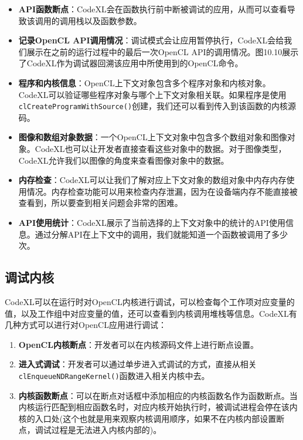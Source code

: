\begin{itemize}
\item \textbf{API函数断点}：CodeXL会在函数执行前中断被调试的应用，从而可以查看导致该调用的调用栈以及函数参数。
\item \textbf{记录OpenCL API调用情况}：调试模式会让应用暂停执行，CodeXL会给我们展示在之前的运行过程中的最后一次OpenCL API的调用情况。图10.10展示了CodeXL作为调试器回溯该应用中所使用到的OpenCL命令。
\item \textbf{程序和内核信息}：OpenCL上下文对象包含多个程序对象和内核对象。CodeXL可以验证哪些程序对象与哪个上下文对象相关联。如果程序是使用\texttt{clCreateProgramWithSource()}创建，我们还可以看到传入到该函数的内核源码。
\item \textbf{图像和数组对象数据}：一个OpenCL上下文对象中包含多个数组对象和图像对象。CodeXL也可以让开发者直接查看这些对象中的数据。对于图像类型，CodeXL允许我们以图像的角度来查看图像对象中的数据。
\item \textbf{内存检查}：CodeXL可以让我们了解对应上下文对象的数组对象中内存内存使用情况。内存检查功能可以用来检查内存泄漏，因为在设备端内存不能直接被查看到，所以要查到相关问题会非常的困难。
\item \textbf{API使用统计}：CodeXL展示了当前选择的上下文对象中的统计的API使用信息。通过分解API在上下文中的调用，我们就能知道一个函数被调用了多少次。
\end{itemize}


\subsection{调试内核}

CodeXL可以在运行时对OpenCL内核进行调试，可以检查每个工作项对应变量的值，以及工作组中对应变量的值，还可以查看到内核调用堆栈等信息。CodeXL有几种方式可以进行对OpenCL应用进行调试：

\begin{enumerate}
\item \textbf{OpenCL内核断点}：开发者可以在内核源码文件上进行断点设置。
\item \textbf{进入式调试}：开发者可以通过单步进入式调试的方式，直接从相关\texttt{clEnqueueNDRangeKernel()}函数进入相关内核中去。
\item \textbf{内核函数断点}：可以在断点对话框中添加相应的内核函数名作为函数断点。当内核运行匹配到相应函数名时，对应内核开始执行时，被调试进程会停在该内核的入口处(这个也就是用来观察内核调用顺序，如果不在内核内部设置断点，调试过程是无法进入内核内部的)。
\end{enumerate}

